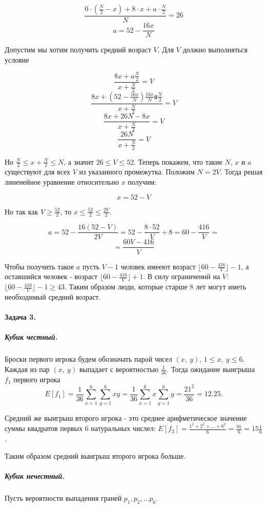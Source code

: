 \documentclass{article}
\newcommand{\pair}[2]{(#1,\ #2)}
\newcommand{\half}[1]{\frac{#1}{2}}
\begin{document}
    $$ \frac{0 \cdot (\half{N} - x) + 8 \cdot x + a \cdot \half{N}}{N} = 26 $$
    $$ a =  52 - \frac{16x}{N}$$

    Допустим мы хотим получить средний возраст $V$. Для $V$ должно выполняться условие

    $$ \frac{8x + a\half{N}} {x + \frac{N}{2}} = V $$
    $$ \frac{8x + (52 - \frac{16x}{N})\frac{16x}{N}я\half{N}} {x + \frac{N}{2}} = V $$ 
    $$ \frac{8x + 26N - 8x} {x + \frac{N}{2}} = V $$
    $$ \frac{26N} {x + \frac{N}{2}} = V $$

    Но $\half{N} \le x + \frac{N}{2} \le N$, а значит $26 \le V \le 52$. Теперь покажем, что такие $N$, $x$ и $a$ существуют для всех $V$ из указанного промежутка. Положим $N = 2V$. Тогда решая линенейное уравнение относительно $x$ получим:

    $$ x = 52 - V$$

    Но так как $V \ge \half{52}$, то $x \le \half{52} \le \half{2V}$. 

    $$ a =  52 - \frac{16(52 - V)}{2V} = 52 - \frac{8 \cdot 52}{V} + 8 = 60 - \frac{416}{V} = $$
    $$   =  \frac{60V - 416}{V}$$

    Чтобы получить такое $a$ пусть $V - 1$ человек имееют возраст $\lfloor 60 - \frac{416}{V} \rfloor - 1$, а оставшийся человек - возраст $\lfloor 60 - \frac{416}{V} \rfloor + 1$. В силу ограничений на $V$: $\lfloor 60 - \frac{416}{V} \rfloor - 1 \ge 43$. Таким образом люди, которые старше 8 лет могут иметь необходимый средний возраст.

    \paragraph{Задача 3.}
    \subparagraph{Кубик честный.}
    Броски первого игрока будем обозначать парой чисел $(x,\ y)$, $1 \le x,\ y \le 6$. Каждая из пар $\pair{x}{y}$ выпадает с вероятностью $\frac{1}{36}$. Тогда ожидание выигрыша $f_1$ первого игрока 
    $$E[f_1] = \frac{1}{36}\sum_{x=1}^{6}\sum_{y=1}^{6} xy = \frac{1}{36} \sum_{x=1}^{6} x \sum_{y=1}^{6} y = \frac{21^2}{36} = 12.25.$$

    Средний же выигрыш второго игрока - это среднее арифметическое значение суммы квадратов первых 6 натуральных числел: $E[f_2] = \frac{1^2 + 2^2 + \ldots + 6^2}{6} = \frac{91}{6} = 15\frac{1}{6}$.

    Таким образом средний выигрыш второго игрока больше.

    \subparagraph{Кубик нечестный.}
    Пусть вероятности выпадения граней $p_1, p_2, \ldots p_6$.
\end{document}
